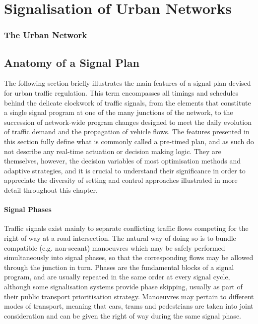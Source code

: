 \chapter{Signalisation of Urban Networks}
\subsection{The Urban Network} \label{s:urbannetwork}

\section{Anatomy of a Signal Plan} \label{s:anatomy}
The following section briefly illustrates the main features of a signal plan devised for urban traffic regulation. This term encompasses all timings and schedules behind the delicate clockwork of traffic signals, from the elements that constitute a single signal program at one of the many junctions of the network, to the succession of network-wide program changes designed to meet the daily evolution of traffic demand and the propagation of vehicle flows.
The features presented in this section fully define what is commonly called a pre-timed plan, and as such do not describe any real-time actuation or decision making logic.
They are themselves, however, the decision variables of most optimisation methods and adaptive strategies, and it is crucial to understand their significance in order to appreciate the diversity of setting and control approaches illustrated in more detail throughout this chapter.


\subsubsection{Signal Phases}
Traffic signals exist mainly to separate conflicting traffic flows competing for the right of way at a road intersection. The natural way of doing so is to bundle compatible (e.g. non-secant) manoeuvres which may be safely performed simultaneously into signal phases, so that the corresponding flows may be allowed through the junction in turn.
Phases are the fundamental blocks of a signal program, and are usually repeated in the same order at every signal cycle, although some signalisation systems provide phase skipping, usually as part of their public transport prioritisation strategy.
Manoeuvres may pertain to different modes of transport, meaning that cars, trams and
pedestrians are taken into joint consideration and can be given the right of way during the
same signal phase.

